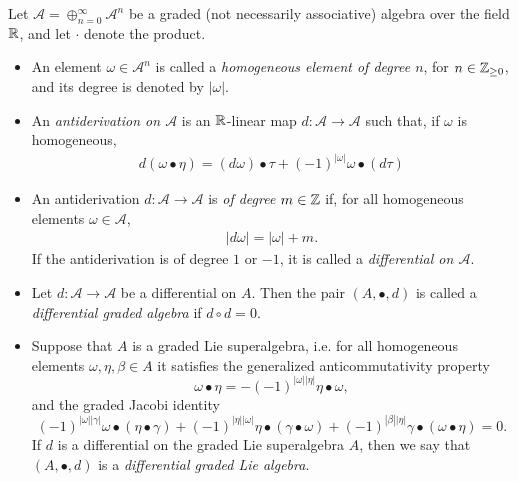 \begin{definition} \label{defnDiffGAlgebraLieALgebraMorphism}
Let $\mathcal A = \oplus_{n = 0}^\infty \mathcal A^n$ be a graded (not necessarily associative) algebra over the field $\mathbb{R}$, and let $\cdot$ denote the product.
    \begin{itemize}
    
    \item An element $\omega \in \mathcal A^n$ is called a \emph{homogeneous element of degree $n$}, for $n \in \mathbb{Z}_{\geq 0}$, and its degree is denoted by $|\omega|$.
    
    \item An \emph{antiderivation on $\mathcal A$} is an $\mathbb{R}$-linear map $d: \mathcal A \to \mathcal A$ such that, if $\omega$ is homogeneous, 
    \begin{align}\label{equationDefinitionGradedLeibnizInDifferentialGradedAlgebra}
        d(\omega \bullet \eta) = (d\omega)\bullet\tau + (-1)^{|\omega|} \omega \bullet (d\tau)
    \end{align}
    
    \item An antiderivation $d: \mathcal A \to \mathcal A$ is \emph{of degree $m \in \mathbb{Z}$} if, for all homogeneous elements $\omega \in \mathcal A$,
    \begin{align}
        |d\omega| = |\omega| + m.
    \end{align}
    If the antiderivation is of degree $1$ or $-1$, it is called a \emph{differential on $\mathcal A$}.
    
    \item Let $d: \mathcal A \to \mathcal A$ be a differential on $A$. Then the pair $(A, \bullet, d)$ is called a \emph{differential graded algebra} if $d \circ d = 0$. 
    
    \item Suppose that $A$ is a graded Lie superalgebra, i.e. for all homogeneous elements $\omega, \eta, \beta \in A$ it satisfies the generalized anticommutativity property
    \begin{equation}\label{equationGradedCommutativeMinusGeneral}
        \omega \bullet \eta = -(-1)^{|\omega||\eta|} \eta \bullet \omega,
    \end{equation}
    and the graded Jacobi identity
    \begin{equation}\label{gradedJacobiIdentityGeneralizedAssociativity}
        (-1)^{|\omega||\gamma|} \omega \bullet (\eta \bullet \gamma) +
        (-1)^{|\eta||\omega|} \eta \bullet (\gamma \bullet \omega) +
        (-1)^{|\beta||\eta|} \gamma \bullet (\omega \bullet \eta) = 0.
    \end{equation}
    If $d$ is a differential on the graded Lie superalgebra $A$, then we say that $(A, \bullet, d)$ is a \emph{differential graded Lie algebra}.
    

\end{itemize}
\end{definition}
